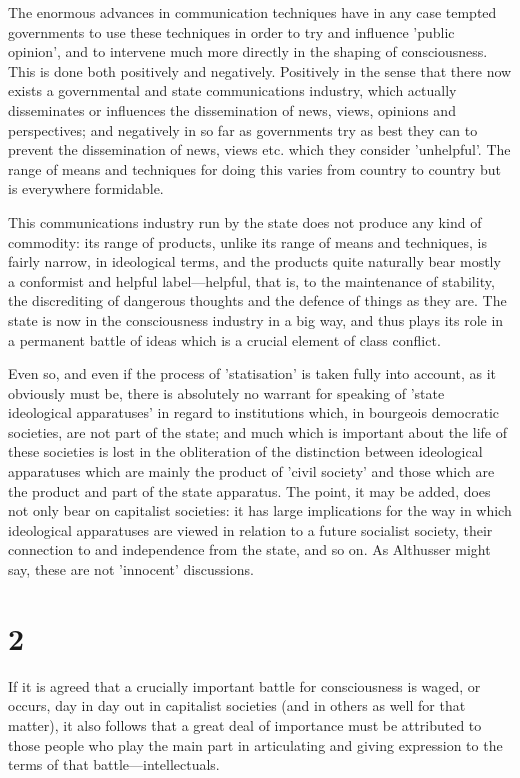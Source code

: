 The enormous advances in communication techniques have in any case tempted governments to use these techniques in order to try and influence 'public opinion', and to intervene much more directly in the shaping of consciousness. This is done both positively and negatively. Positively in the sense that there now exists a governmental and state communications industry, which actually disseminates or influences the dissemination of news, views, opinions and perspectives; and negatively in so far as governments try as best they can to prevent the dissemination of news, views etc. which they consider 'unhelpful'. The range of means and techniques for doing this varies from country to country but is everywhere formidable.

This communications industry run by the state does not produce any kind of commodity: its range of products, unlike its range of means and techniques, is fairly narrow, in ideological terms, and the products quite naturally bear mostly a conformist and helpful label—helpful, that is, to the maintenance of stability, the discrediting of dangerous thoughts and the defence of things as they are. The state is now in the consciousness industry in a big way, and thus plays its role in a permanent battle of ideas which is a crucial element of class conflict.

Even so, and even if the process of 'statisation' is taken fully into account, as it obviously must be, there is absolutely no warrant for speaking of 'state ideological apparatuses' in regard to institutions which, in bourgeois democratic societies, are not part of the state; and much which is important about the life of these societies is lost in the obliteration of the distinction between ideological apparatuses which are mainly the product of 'civil society' and those which are the product and part of the state apparatus. The point, it may be added, does not only bear on capitalist societies: it has large implications for the way in which ideological apparatuses are viewed in relation to a future socialist society, their connection to and independence from the state, and so on. As Althusser might say, these are not 'innocent' discussions.

\section*{2}

If it is agreed that a crucially important battle for consciousness is waged, or occurs, day in day out in capitalist societies (and in others as well for that matter), it also follows that a great deal of importance must be attributed to those people who play the main part in articulating and giving expression to the terms of that battle—intellectuals.

